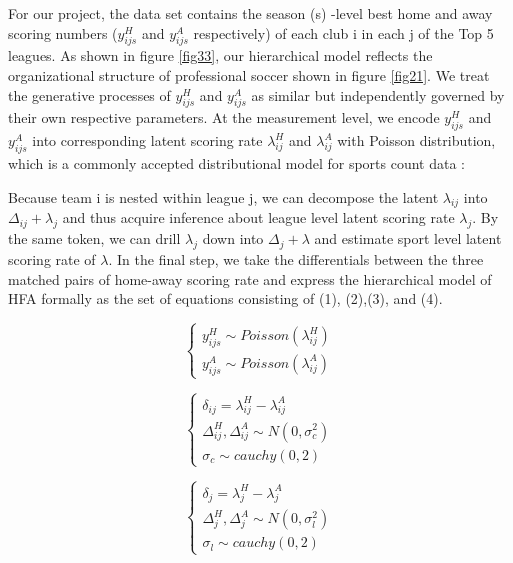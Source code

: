 \documentclass[USenglish]{article}
\begin{document}
 
For our project, the data set contains the season (s) -level best home and away scoring numbers ($y^H_{ijs}$ and   $y^A_{ijs}$ respectively) of each club i in each j of the Top 5 leagues. As shown in figure \ref{fig33}, our hierarchical model reflects the organizational structure of professional soccer shown in figure \ref{fig21}. We treat the generative processes of $y^H_{ijs}$ and $y^A_{ijs}$ as similar but independently governed by their own respective parameters. At the measurement level, we encode $y^H_{ijs}$ and $y^A_{ijs}$ into corresponding latent scoring rate $\lambda^H_{ij}$ and $\lambda^A_{ij}$ with Poisson distribution, which is a commonly accepted distributional model for sports count data \citep{Miller2015}:

Because team i is nested within league j, we can decompose the latent $\lambda_{ij}$ into $\Delta_{ij}+\lambda_j$ and thus acquire inference about league level latent scoring rate $\lambda_j$. By the same token, we can drill $\lambda_j$ down into $\Delta_{j}+\lambda$ and estimate sport level latent scoring rate of $\lambda$. In the final step, we take the differentials between the three matched pairs of home-away scoring rate and express the hierarchical model of HFA formally as the set of equations consisting of (1), (2),(3), and (4). 

\begin{equation}
\begin{cases}
y^H_{ijs} \sim Poisson(\lambda^H_{ij})\\
y^A_{ijs} \sim Poisson(\lambda^A_{ij})
\end{cases}
\end{equation}

\begin{equation}
\begin{cases}
\delta_{ij} = \lambda^H_{ij} - \lambda^A_{ij}\\  
\Delta^H_{ij}, \Delta^A_{ij}  \sim N(0, \sigma^2_c)\\  
\sigma_c \sim cauchy(0,2)
\end{cases}
\end{equation} 

\begin{equation}
\begin{cases}
\delta_{j} = \lambda^H_{j} - \lambda^A_{j}\\  
\Delta^H_{j}, \Delta^A_{j} \sim N(0, \sigma^2_l)\\
\sigma_l \sim cauchy(0,2)
\end{cases}
\end{equation} 
\end{document}

